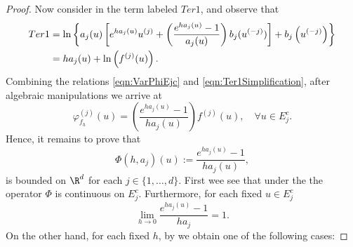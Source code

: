 \begin{proof}
	Now consider in  the term labeled $Ter1$, and observe that
	\begin{align}
		Ter1&=
			\ln\left\{
				a_j(u)\left[
					e^{ha_j(u)}u^{(j)} +
					\left(
						\frac{e^{ha_j(u)}-1}{a_j(u)}
					\right) b_j(u^{(-j)})	
				\right]
				+b_j\left(u^{(-j)}\right)
			\right\} \notag \\
		&=h a_j(u) + \ln \left( f^{(j)}(u) \right).
		\label{eqn:Ter1Simplification}		
	\end{align}
	Combining the relations \eqref{eqn:VarPhiEjc} and \eqref{eqn:Ter1Simplification},
	after algebraic manipulations we arrive at 
	\begin{equation}\label{eqn:VarPhiBound}
		\varphi_{f_h}^{(j)}(u) =
			\left(
				\frac{e^{ha_j(u)}-1}{h a_j(u)}
			\right)
			f^{(j)}(u), \quad \forall u \in E_j^c.
	\end{equation}
	Hence, it remains to prove that 
	\begin{equation}\label{eqn:ExpBound}
		\Phi(h, a_j)(u):=\frac{e^{ha_j(u)}-1}{ha_j(u)},
	\end{equation}
	is bounded on $\R^d$ for each $j\in \{ 1,\dots, d\}$.
	First wee see that under the  the operator $\Phi$ is continuous
	on $E_j^c$. Furthermore, for each fixed $u\in E_j^c$
	$$
		\lim_{h\to 0}
		\frac{e^{ha_j(u)}-1}{ha_j}=1.
	$$ 
	On the other hand, for each fixed $h$,  by  we obtain 
	one of the following cases:
	

\end{proof}
